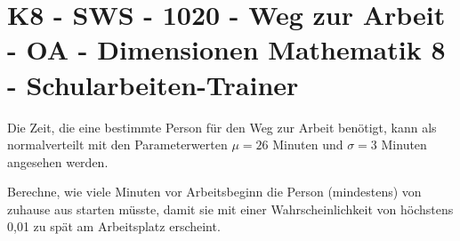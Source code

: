 \section{K8 - SWS - 1020 - Weg zur Arbeit - OA - Dimensionen Mathematik 8 - Schularbeiten-Trainer}

\begin{beispiel}[K8 - SWS]{1}
Die Zeit, die eine bestimmte Person für den Weg zur Arbeit benötigt, kann als normalverteilt mit den Parameterwerten $\mu=26$ Minuten und $\sigma=3$ Minuten angesehen werden.

Berechne, wie viele Minuten vor Arbeitsbeginn die Person (mindestens) von zuhause aus starten müsste, damit sie mit einer Wahrscheinlichkeit von höchstens 0,01 zu spät am Arbeitsplatz erscheint.

\end{beispiel}